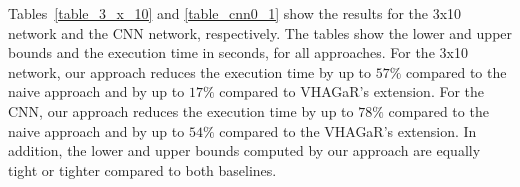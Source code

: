 Tables~\ref{table_3_x_10} and \ref{table_cnn0_1} show the results for the 3x10 network and the CNN network, respectively.
The tables show the lower and upper bounds and the execution time in seconds, for all approaches.
For the 3x10 network, our approach reduces the execution time by up to $57\%$ compared to the naive approach and by up to $17\%$ compared to VHAGaR's extension.
For the CNN, our approach reduces the execution time by up to $78\%$ compared to the naive approach and by up to $54\%$ compared to the VHAGaR's extension.
In addition, the lower and upper bounds computed by our approach are equally tight or tighter compared to both baselines. %

